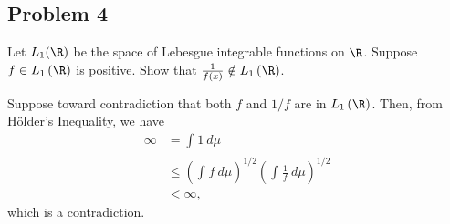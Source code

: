 \documentclass[10pt]{mypackage}
\begin{document}
\subsection{Problem 4}%
\begin{problem}
  Let $L_1(\R)$ be the space of Lebesgue integrable functions on $\R$. Suppose $f\in L_1\left( \R \right)$ is positive. Show that $\frac{1}{f(x)}\notin L_1\left( \R \right)$.
\end{problem}
Suppose toward contradiction that both $f$ and $1/f$ are in $L_1\left( \R \right)$. Then, from Hölder's Inequality, we have
\begin{align*}
  \infty &= \int_{}^{} 1\:d\mu\\
         &\leq \left( \int_{}^{} f\:d\mu \right)^{1/2} \left( \int_{}^{} \frac{1}{f}\:d\mu \right)^{1/2}\\
         &< \infty,
\end{align*}
which is a contradiction.
\end{document}
